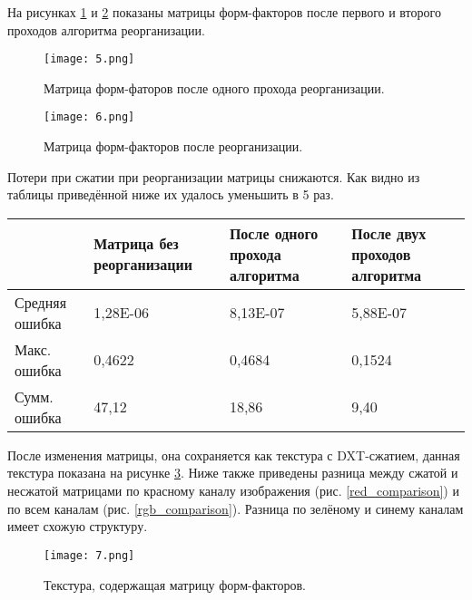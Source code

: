 \documentclass[12pt,fleqn]{article}
\begin{document}
На рисунках \ref{reorder_1} и \ref{reorder_2} показаны матрицы форм-факторов после первого и второго проходов алгоритма реорганизации.

\begin{figure}[htb]
    \centering
    \texttt{[image: 5.png]}
    \caption{Матрица форм-фаторов после одного прохода реорганизации.}
    \label{reorder_1}
\end{figure}

\pagebreak

\begin{figure}[htb]
    \centering
    \texttt{[image: 6.png]}
    \caption{Матрица форм-факторов после реорганизации.}
    \label{reorder_2}
\end{figure}

\pagebreak

Потери при сжатии при реорганизации матрицы снижаются. Как видно из таблицы приведённой ниже их удалось уменьшить в 5 раз.

\begin{center}

\begin{tabular}{|p{}|p{}|p{}|p{}|}

\hline
~ & Матрица без реорганизации & После одного прохода алгоритма & После двух проходов алгоритма \\ \hline
Средняя ошибка & 1,28E-06 & 8,13E-07 & 5,88E-07 \\ \hline
Макс. ошибка & 0,4622 & 0,4684 & 0,1524 \\ \hline
Сумм. ошибка & 47,12 & 18,86 & 9,40 \\ \hline

\end{tabular}

\end{center}

После изменения матрицы, она сохраняется как текстура с DXT-сжатием, данная текстура показана на рисунке \ref{ff_texture}. Ниже также приведены разница между сжатой и несжатой матрицами по красному каналу изображения (рис. \ref{red_comparison}) и по всем каналам (рис. \ref{rgb_comparison}). Разница по зелёному и синему каналам имеет схожую структуру.

\begin{figure}[htb]
    \centering
    \texttt{[image: 7.png]}
    \caption{Текстура, содержащая матрицу форм-факторов.}
    \label{ff_texture}
\end{figure}
\end{document}
